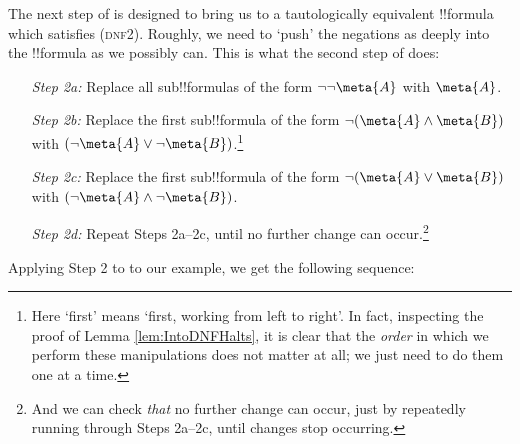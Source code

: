 \documentclass[../../../include/open-logic-section]{subfiles}
\begin{document}
The next step of \intoDNF{} is designed to bring us to a tautologically equivalent !!{formula} which satisfies (\textsc{dnf2}). Roughly, we need to `push' the negations as deeply into the !!{formula} as we possibly can. This is what the second step of \intoDNF{} does:
	\begin{itemize}
		\item[\emph{Step 2a:}] Replace all sub!!{formula}s of the form $\lnot\lnot\meta{A}$ with $\meta{A}$.
		\item[\emph{Step 2b:}] Replace the first sub!!{formula} of the form  $\lnot (\meta{A} \land \meta{B})$ with $(\lnot \meta{A} \lor \lnot \meta{B})$.\footnote{Here `first' means `first, working from left to right'. In fact, inspecting the proof of Lemma \ref{lem:IntoDNFHalts}, it is clear that the \emph{order} in which we perform these manipulations does not matter at all; we just need to do them one at a time.}
		\item[\emph{Step 2c:}] Replace the first sub!!{formula} of the form  $\lnot (\meta{A} \lor \meta{B})$ with $(\lnot \meta{A} \land \lnot \meta{B})$. 
		\item[\emph{Step 2d:}] Repeat Steps 2a--2c, until no further change can occur.\footnote{And we can check \emph{that} no further change can occur, just by repeatedly running through Steps 2a--2c, until changes stop occurring.}
	\end{itemize}
Applying Step 2 to to our example, we get the following sequence:
\end{document}
